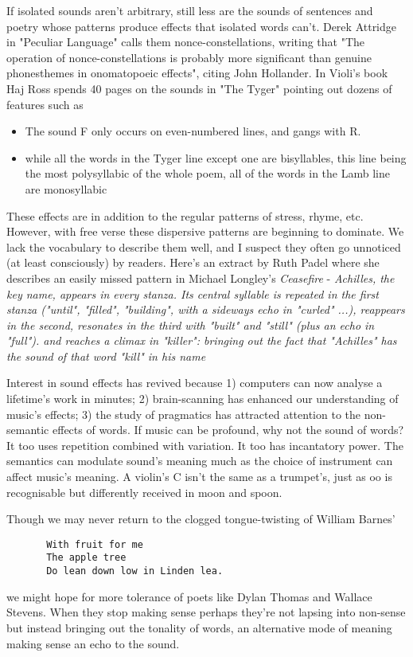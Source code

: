 \documentclass[11pt]{article}
\begin{document}
If isolated sounds aren't arbitrary, still less are the sounds of sentences and poetry whose patterns produce effects that isolated words can't. Derek Attridge in "Peculiar Language" calls them nonce-constellations, writing that "The operation of nonce-constellations is probably more significant than genuine phonesthemes in onomatopoeic effects", citing John Hollander. In Violi's book Haj Ross spends 40 pages on the sounds in "The Tyger" pointing out dozens of features such as
\begin{itemize}
\item    The sound F only occurs on even-numbered lines, and gangs with R.
\item    while all the words in the Tyger line except one are bisyllables, this line being the most polysyllabic of the whole poem, all of the words in the Lamb line are monosyllabic
\end{itemize}

These effects are in addition to the regular patterns of stress, rhyme, etc. However, with free verse these dispersive patterns are beginning to dominate. We lack the vocabulary to describe them well, and I suspect they often go unnoticed (at least consciously) by readers. Here's an extract by Ruth Padel where she describes an easily missed pattern in Michael Longley's \textit{Ceasefire} -
\textit{Achilles, the key name, appears in every stanza. Its central syllable is repeated in the first stanza ("until", "filled", "building", with a sideways echo in "curled" ...), reappears in the second, resonates in the third with "built" and "still" (plus an echo in "full"). and reaches a climax in "killer": bringing out the fact that "Achilles" has the sound of that word "kill" in his name}

Interest in sound effects has revived because 1) computers can now analyse a lifetime's work in minutes; 2) brain-scanning has enhanced our understanding of music's effects; 3) the study of pragmatics has attracted attention to the non-semantic effects of words. If music can be profound, why not the sound of words? It too uses repetition combined with variation. It too has incantatory power. The semantics can modulate sound's meaning much as the choice of instrument can affect music's meaning. A violin's C isn't the same as a trumpet's, just as oo is recognisable but differently received in moon and spoon.

Though we may never return to the clogged tongue-twisting of William Barnes'
\begin{verbatim}
       With fruit for me
       The apple tree
       Do lean down low in Linden lea.
\end{verbatim}
we might hope for more tolerance of poets like Dylan Thomas and Wallace Stevens. When they stop making sense perhaps they're not lapsing into non-sense but instead bringing out the tonality of words, an alternative mode of meaning making sense an echo to the sound. 
\end{document}
